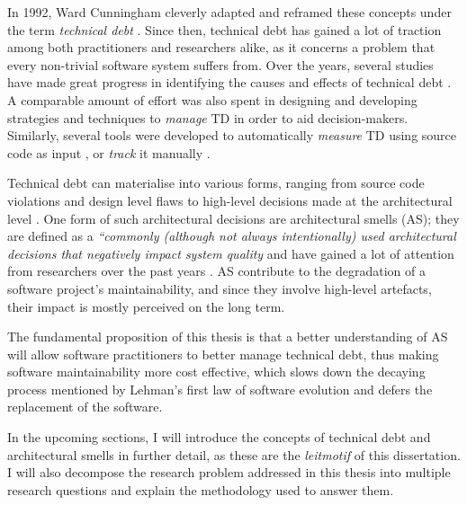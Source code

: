 In 1992, Ward Cunningham cleverly adapted and reframed these concepts under the term \emph{technical debt} \cite{Cunningham1992}. 
Since then, technical debt has gained a lot of traction among both practitioners and researchers alike, as it concerns a problem that every non-trivial software system suffers from. 
Over the years, several studies have made great progress in identifying the causes and effects of technical debt \cite{Brown2010,Kruchten2012}.
A comparable amount of effort was also spent in designing and developing strategies and techniques to \emph{manage} TD \cite{Li2015} in order to aid decision-makers. 
Similarly, several tools were developed to automatically \emph{measure} TD using source code as input \cite{Avgeriou2021}, or \emph{track} it manually \cite{Martini2016}.

Technical debt can materialise into various forms, ranging from source code violations \cite{Letouzey2012,Curtis2012} and design level flaws \cite{Marinescu2012} to high-level decisions made at the architectural level \cite{Ernst2015,Yli-Huumo2014}. One form of such architectural decisions are architectural smells (AS); they are defined as a \emph{``commonly (although not always intentionally) used architectural decisions that negatively impact system quality} \cite{Garcia2009} and have gained a lot of attention from researchers over the past years \cite{Verdecchia2018}.
AS contribute to the degradation of a software project's maintainability, and since they involve high-level artefacts, their impact is mostly perceived on the long term. 

The fundamental proposition of this thesis is that a better understanding of AS will allow software practitioners to better manage technical debt, thus making software maintainability more cost effective, which slows down the decaying process mentioned by Lehman's first law of software evolution and defers the replacement of the software.

In the upcoming sections, I will introduce the concepts of technical debt and architectural smells in further detail, as these are the \emph{leitmotif} of this dissertation.
I will also decompose the research problem addressed in this thesis into multiple research questions and explain the methodology used to answer them.


